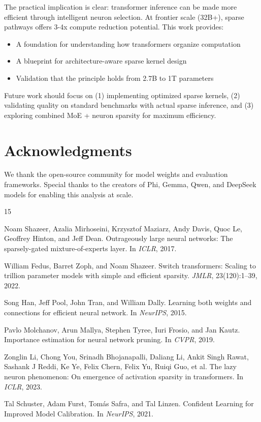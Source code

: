 \documentclass{article}
\begin{document}
The practical implication is clear: transformer inference can be made more efficient through intelligent neuron selection. At frontier scale (32B+), sparse pathways offers 3-4x compute reduction potential. This work provides:
\begin{itemize}
    \item A foundation for understanding how transformers organize computation
    \item A blueprint for architecture-aware sparse kernel design
    \item Validation that the principle holds from 2.7B to 1T parameters
\end{itemize}

Future work should focus on (1) implementing optimized sparse kernels, (2) validating quality on standard benchmarks with actual sparse inference, and (3) exploring combined MoE + neuron sparsity for maximum efficiency.

\section*{Acknowledgments}

We thank the open-source community for model weights and evaluation frameworks. Special thanks to the creators of Phi, Gemma, Qwen, and DeepSeek models for enabling this analysis at scale.


\begin{thebibliography}{15}

Noam Shazeer, Azalia Mirhoseini, Krzysztof Maziarz, Andy Davis, Quoc Le, Geoffrey Hinton, and Jeff Dean.
\newblock Outrageously large neural networks: The sparsely-gated mixture-of-experts layer.
\newblock In \emph{ICLR}, 2017.

William Fedus, Barret Zoph, and Noam Shazeer.
\newblock Switch transformers: Scaling to trillion parameter models with simple and efficient sparsity.
\newblock \emph{JMLR}, 23(120):1--39, 2022.

Song Han, Jeff Pool, John Tran, and William Dally.
\newblock Learning both weights and connections for efficient neural network.
\newblock In \emph{NeurIPS}, 2015.

Pavlo Molchanov, Arun Mallya, Stephen Tyree, Iuri Frosio, and Jan Kautz.
\newblock Importance estimation for neural network pruning.
\newblock In \emph{CVPR}, 2019.

Zonglin Li, Chong You, Srinadh Bhojanapalli, Daliang Li, Ankit Singh Rawat, Sashank J Reddi, Ke Ye, Felix Chern, Felix Yu, Ruiqi Guo, et al.
\newblock The lazy neuron phenomenon: On emergence of activation sparsity in transformers.
\newblock In \emph{ICLR}, 2023.

Tal Schuster, Adam Furst, Tomás Safra, and Tal Linzen.
\newblock Confident Learning for Improved Model Calibration.
\newblock In \emph{NeurIPS}, 2021.

\end{thebibliography}
\end{document}

